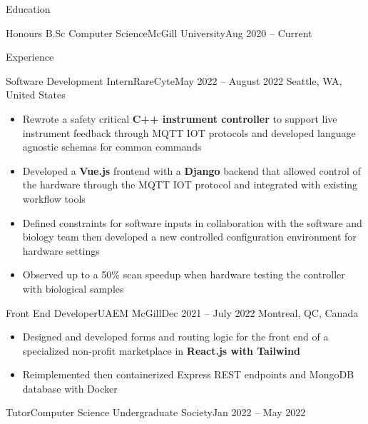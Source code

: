 \documentclass[]{mcdowellcv}
\begin{document}
\let\CITY=M

\let\WEB=C

\makeheader

\begin{cvsection}{Education}
	\begin{cvsubsection}{\normalfont Honours B.Sc Computer Science}{McGill University}{Aug 2020 -- Current}
	\end{cvsubsection}
	\vspace{-13mm}
\end{cvsection}
\begin{cvsection}{Experience}
	\begin{cvsubsection}{Software Development Intern}{RareCyte}{May 2022 -- August 2022}
		Seattle, WA, United States
		\begin{itemize}%
			\item Rewrote a safety critical \textbf{C++ instrument controller} to support live instrument feedback through MQTT IOT protocols and developed language agnostic schemas for common commands
			\item Developed a \textbf{Vue.js} frontend with a \textbf{Django} backend that allowed control of the hardware through the MQTT IOT protocol and integrated with existing workflow tools
			\item Defined constraints for software inputs in collaboration with the software and biology team then developed a new controlled configuration environment for hardware settings
			\item Observed up to a 50\% scan speedup when hardware testing the controller with biological samples
		\end{itemize}
	\end{cvsubsection}
	\begin{cvsubsection}{Front End Developer}{UAEM McGill}{Dec 2021 -- July 2022}
		\vspace{-2.5mm}
		Montreal, QC, Canada
		\begin{itemize}%
			\item Designed and developed forms and routing logic for the front end of a specialized non-profit marketplace in \textbf{React.js with Tailwind}
			\item Reimplemented then containerized Express REST endpoints and MongoDB database with Docker
		\end{itemize}
	\end{cvsubsection}
	\begin{cvsubsection}{Tutor}{Computer Science Undergraduate Society}{Jan 2022 -- May 2022}

\end{cvsubsection}
\end{cvsection}
\end{document}
